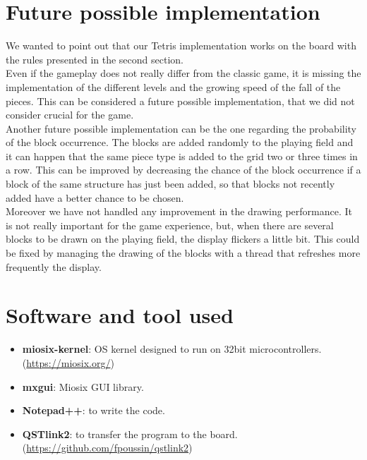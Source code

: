 \documentclass[18pt,oneside,a4paper, titlepage]{article}
\begin{document}
\newpage


\newpage
\section{Future possible implementation}
	We wanted to point out that our Tetris implementation works on the board with the rules presented in the second section.\\
	Even if the gameplay does not really differ from the classic game, it is missing the implementation of the different levels and the growing speed of the fall of the pieces. This can be considered a future possible implementation, that we did not consider crucial for the game.\\
	Another future possible implementation can be the one regarding the probability of the block occurrence. The blocks are added randomly to the playing field and it can happen that the same piece type is added to the grid two or three times in a row. This can be improved by decreasing the chance of the block occurrence if a block of the same structure has just been added, so that blocks not recently added have a better chance to be chosen.\\
	Moreover we have not handled any improvement in the drawing performance. It is not really important for the game experience, but, when there are several blocks to be drawn on the playing field, the display flickers a little bit. This could be fixed by managing the drawing of the blocks with a thread that refreshes more frequently the display.
	
\newpage
\section{Software and tool used}
	\begin{itemize}
		\item \textbf{miosix-kernel}: OS kernel designed to run on 32bit microcontrollers. (\url{https://miosix.org/})
		\item \textbf{mxgui}: Miosix GUI library.
		\item \textbf{Notepad++}: to write the code.
		\item \textbf{QSTlink2}: to transfer the program to the board. (\url{https://github.com/fpoussin/qstlink2})
	\end{itemize}
\end{document}
